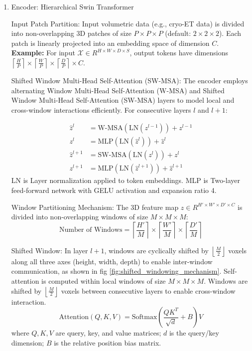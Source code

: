 \documentclass{article}
\begin{document}
\begin{enumerate}
    \item Encoder: Hierarchical Swin Transformer
    
    Input Patch Partition:
    Input volumetric data (e.g., cryo-ET data) is divided into non-overlapping 3D patches of size \( P \times P \times P \) (default: \( 2 \times 2 \times 2 \)). Each patch is linearly projected into an embedding space of dimension \( C \).  
    \textbf{Example:} For input \( \mathcal{X} \in R^{H \times W \times D \times S} \), output tokens have dimensions \( \left\lceil \frac{H}{P} \right\rceil \times \left\lceil \frac{W}{P} \right\rceil \times \left\lceil \frac{D}{P} \right\rceil \times C \).

    Shifted Window Multi-Head Self-Attention (SW-MSA)\cite{liuSwinTransformerHierarchical2021}:     
    The encoder employs alternating Window Multi-Head Self-Attention (W-MSA) and Shifted Window Multi-Head Self-Attention (SW-MSA) layers to model local and cross-window interactions efficiently.  
For consecutive layers \( l \) and \( l+1 \):  

\begin{align}
    \hat{z}^l &= \text{W-MSA}\left(\text{LN}(z^{l-1})\right) + z^{l-1} \nonumber \\
    z^l &= \text{MLP}\left(\text{LN}(\hat{z}^l)\right) + \hat{z}^l \nonumber \\
    \hat{z}^{l+1} &= \text{SW-MSA}\left(\text{LN}(z^l)\right) + z^l \nonumber \\
    z^{l+1} &= \text{MLP}\left(\text{LN}(\hat{z}^{l+1})\right) + \hat{z}^{l+1}
\end{align}
LN is Layer normalization applied to token embeddings.  
MLP is Two-layer feed-forward network with GELU activation and expansion ratio 4.  

Window Partitioning Mechanism: The 3D feature map \( z \in R^{H' \times W' \times D' \times C} \) is divided into non-overlapping windows of size \( M \times M \times M \):  
\begin{equation}
    \text{Number of Windows} = \left\lceil \frac{H'}{M} \right\rceil \times \left\lceil \frac{W'}{M} \right\rceil \times \left\lceil \frac{D'}{M} \right\rceil
\end{equation}

Shifted Window: In layer \( l+1 \), windows are cyclically shifted by \( \left\lfloor \frac{M}{2} \right\rfloor \) voxels along all three axes (height, width, depth) to enable inter-window communication, as shown in fig \ref{fig:shifted_windowing_mechanism}.  
Self-attention is computed within local windows of size \( M \times M \times M \). Windows are shifted by \( \left\lfloor \frac{M}{2} \right\rfloor \) voxels between consecutive layers to enable cross-window interaction.  
\begin{equation}
\text{Attention}(Q, K, V) = \text{Softmax}\left( \frac{QK^T}{\sqrt{d}} + B \right) V
\end{equation}
where \( Q, K, V \) are query, key, and value matrices; \( d \) is the query/key dimension; \( B \) is the relative position bias matrix\cite{Vaswani2017AttentionIA}.  


\end{enumerate}
\end{document}
